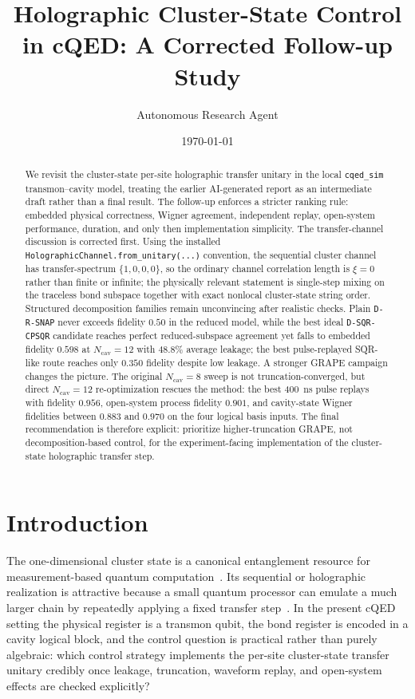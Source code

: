 \documentclass[aps,pra,twocolumn,reprint,amsmath,amssymb]{revtex4-2}
\begin{document}
\title{Holographic Cluster-State Control in cQED: A Corrected Follow-up Study}
\author{Autonomous Research Agent}
\date{\today}

\begin{abstract}
We revisit the cluster-state per-site holographic transfer unitary in the local
\texttt{cqed\_sim} transmon--cavity model, treating the earlier AI-generated
report as an intermediate draft rather than a final result. The follow-up
enforces a stricter ranking rule: embedded physical correctness, Wigner
agreement, independent replay, open-system performance, duration, and only then
implementation simplicity. The transfer-channel discussion is corrected first.
Using the installed \texttt{HolographicChannel.from\_unitary(...)} convention,
the sequential cluster channel has transfer-spectrum $\{1,0,0,0\}$, so the
ordinary channel correlation length is $\xi=0$ rather than finite or infinite;
the physically relevant statement is single-step mixing on the traceless bond
subspace together with exact nonlocal cluster-state string order. Structured
decomposition families remain unconvincing after realistic checks. Plain
\texttt{D-R-SNAP} never exceeds fidelity $0.50$ in the reduced model, while the
best ideal \texttt{D-SQR-CPSQR} candidate reaches perfect reduced-subspace
agreement yet falls to embedded fidelity $0.598$ at $N_{\mathrm{cav}}=12$ with
$48.8\%$ average leakage; the best pulse-replayed SQR-like route reaches only
$0.350$ fidelity despite low leakage. A stronger GRAPE campaign changes the
picture. The original $N_{\mathrm{cav}}=8$ sweep is not truncation-converged,
but direct $N_{\mathrm{cav}}=12$ re-optimization rescues the method: the best
\SI{400}{ns} pulse replays with fidelity $0.956$, open-system process fidelity
$0.901$, and cavity-state Wigner fidelities between $0.883$ and $0.970$ on the
four logical basis inputs. The final recommendation is therefore explicit:
prioritize higher-truncation GRAPE, not decomposition-based control, for the
experiment-facing implementation of the cluster-state holographic transfer step.
\end{abstract}

\maketitle

\section{Introduction}
The one-dimensional cluster state is a canonical entanglement resource for
measurement-based quantum computation~\cite{briegel2001persistent,raussendorf2001one}.
Its sequential or holographic realization is attractive because a small quantum
processor can emulate a much larger chain by repeatedly applying a fixed
transfer step~\cite{barratt2021parallel}. In the present cQED setting the
physical register is a transmon qubit, the bond register is encoded in a cavity
logical block, and the control question is practical rather than purely
algebraic: which control strategy implements the per-site cluster-state
transfer unitary credibly once leakage, truncation, waveform replay, and
open-system effects are checked explicitly?
\end{document}
